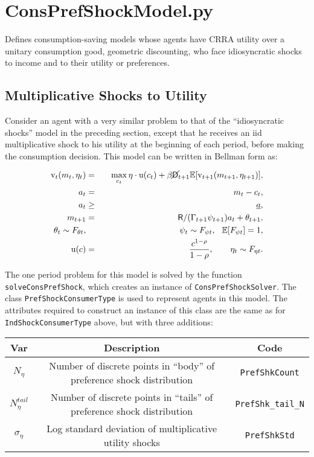 \documentclass[12pt,titlepage,letterpaper]{econtex}
\newcommand{\E}{\mathbb{E}}
\begin{document}
\section{ConsPrefShockModel.py}

Defines consumption-saving models whose agents have CRRA utility over a unitary consumption good, geometric discounting, who face idiosyncratic shocks to income and to their utility or preferences.

\subsection{Multiplicative Shocks to Utility}

Consider an agent with a very similar problem to that of the ``idiosyncratic shocks'' model in the preceding section, except that he receives an iid multiplicative shock to his utility at the beginning of each period, before making the consumption decision.  This model can be written in Bellman form as:

\begin{eqnarray*}
\vFunc_t(m_t,\eta_t) &=& \max_{c_t} \eta \cdot \utilFunc(c_t) + \beta \PLives_{t+1} \E [\vFunc_{t+1}(m_{t+1},\eta_{t+1}) ], \\
a_t &=& m_t - c_t, \\
a_t &\geq& \underline{a}, \\
m_{t+1} &=& \Rfree/(\Gamma_{t+1} \psi_{t+1}) a_t + \theta_{t+1}, \\
\theta_t \sim F_{\theta t}, &\qquad& \psi_t \sim F_{\psi t}, \hspace{0.25cm} \E[F_{\psi t}] = 1, \\
\utilFunc(c) &=& \frac{c^{1-\CRRA}}{1-\CRRA}, \qquad \eta_t \sim F_{\eta t}.
\end{eqnarray*}

The one period problem for this model is solved by the function \texttt{solveConsPrefShock}, which creates an instance of \texttt{ConsPrefShockSolver}.  The class \texttt{PrefShockConsumerType} is used to represent agents in this model.  The attributes required to construct an instance of this class are the same as for \texttt{IndShockConsumerType} above, but with three additions:
\begin{table}[h!]
\centering
\begin{tabular}{c c c}
Var & Description & Code \\
\hline
$N_\eta$ & Number of discrete points in ``body'' of preference shock distribution & \texttt{PrefShkCount} \\
$N_\eta^{tail}$ & Number of discrete points in ``tails'' of preference shock distribution & \texttt{PrefShk\_tail\_N} \\
$\sigma_\eta$ & Log standard deviation of multiplicative utility shocks & \texttt{PrefShkStd}
\end{tabular}
\end{table}
\end{document}
